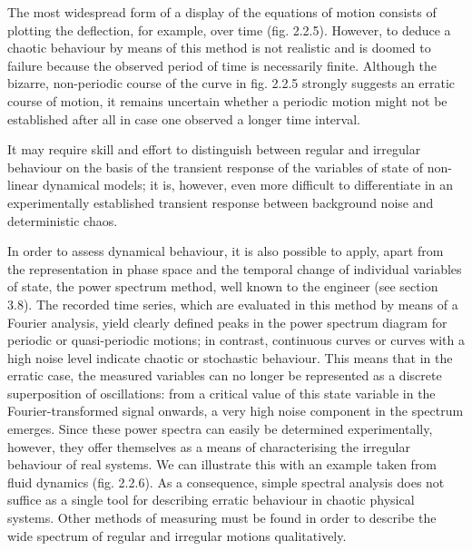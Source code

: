 \documentclass[12pt]{article}
\begin{document}
\hfill

The most widespread form of a display of the equations of motion consists of plotting
the deflection, for example, over time (fig. 2.2.5). However, to deduce a chaotic
behaviour by means of this method is not realistic and is doomed to failure because
the observed period of time is necessarily finite. Although the bizarre, non-periodic
course of the curve in fig. 2.2.5 strongly suggests an erratic course of motion, it
remains uncertain whether a periodic motion might not be established after all in
case one observed a longer time interval.

\hfill

It may require skill and effort to distinguish between regular and irregular behaviour
on the basis of the transient response of the variables of state of non-linear dynamical
models; it is, however, even more difficult to differentiate in an experimentally
established transient response between background noise and deterministic chaos.

\hfill

In order to assess dynamical behaviour, it is also possible to apply, apart from the
representation in phase space and the temporal change of individual variables of
state, the power spectrum method, well known to the engineer (see section 3.8).
The recorded time series, which are evaluated in this method by means of a Fourier
analysis, yield clearly defined peaks in the power spectrum diagram for periodic or
quasi-periodic motions; in contrast, continuous curves or curves with a high noise
level indicate chaotic or stochastic behaviour. This means that in the erratic case,
the measured variables can no longer be represented as a discrete superposition of
oscillations: from a critical value of this state variable in the Fourier-transformed
signal onwards, a very high noise component in the spectrum emerges. Since these
power spectra can easily be determined experimentally, however, they offer themselves
as a means of characterising the irregular behaviour of real systems. We can
illustrate this with an example taken from fluid dynamics (fig. 2.2.6). As a consequence,
simple spectral analysis does not suffice as a single tool for describing
erratic behaviour in chaotic physical systems. Other methods of measuring must
be found in order to describe the wide spectrum of regular and irregular motions
qualitatively.

\hfill
\end{document}
